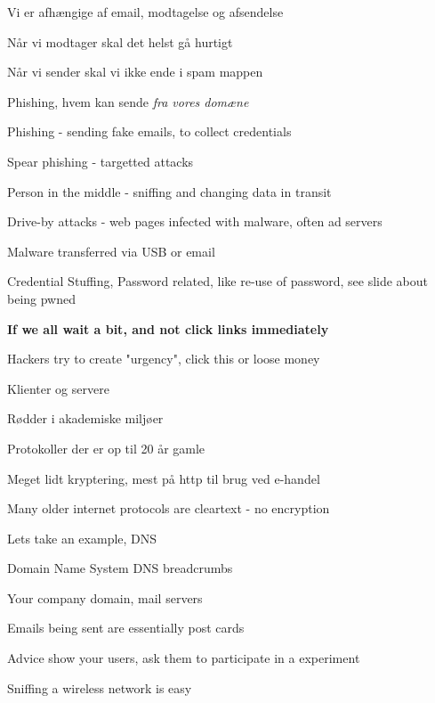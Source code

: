 \documentclass[Screen16to9,17pt]{foils}
\begin{document}
\begin{list2}
\item Vi er afhængige af email, modtagelse og afsendelse
\item Når vi modtager skal det helst gå hurtigt
\item Når vi sender skal vi ikke ende i spam mappen
\item Phishing, hvem kan sende \emph{fra vores domæne}
\end{list2}



\begin{list2}
\item Phishing - sending fake emails, to collect credentials
\item Spear phishing - targetted attacks
\item Person in the middle - sniffing and changing data in transit
\item Drive-by attacks - web pages infected with malware, often ad servers
\item Malware transferred via USB or email
\item Credential Stuffing, Password related, like re-use of password, see slide about being pwned
\end{list2}

\vskip 1cm
\centerline{\Large\bf If we all wait a bit, and not click links immediately}

\vskip 1cm
Hackers try to create "urgency", click this or loose money






\begin{list1}
\item Klienter og servere
\item Rødder i akademiske miljøer
\item Protokoller der er op til 20 år gamle
\item Meget lidt kryptering, mest på http til brug ved e-handel
\end{list1}




\begin{list1}
\item Many older internet protocols are cleartext - no encryption
\item Lets take an example, DNS
\item Domain Name System DNS breadcrumbs
\begin{list2}
\item Your company domain, mail servers
\item Emails being sent are essentially post cards
\end{list2}
\vskip 1cm
\item Advice show your users, ask them to participate in a experiment
\item Sniffing a wireless network is easy
\end{list1}
\end{document}
